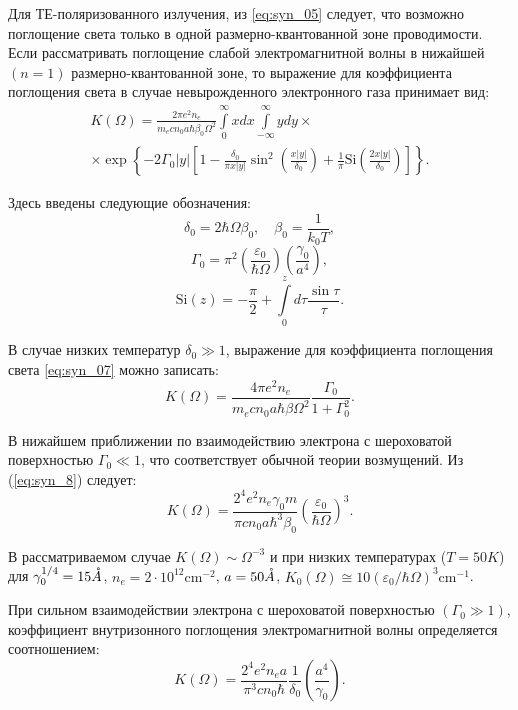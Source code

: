 Для ТЕ-поляризованного излучения, из \eqref{eq:syn_05} следует, что  возможно поглощение света только в одной размерно-квантованной зоне проводимости. Если рассматривать поглощение слабой электромагнитной волны в нижайшей $(n=1)$ размерно-квантованной зоне, то выражение для коэффициента поглощения света в случае невырожденного электронного газа принимает вид:
\begin{multline} \label{eq:syn_07}
K(\Omega) = \frac{2 \pi e^2 n_e }{m_e c n_0 a \hbar \beta_0 \Omega^2} \int\limits_0^{\infty}x dx \int\limits_{-\infty}^{\infty}y dy \times \\
\times \exp{\left\lbrace  - 2\Gamma_0 |y| \left[ 1 - \frac{\delta_0}{\pi x |y|}\sin^2{\left( \frac{x|y|}{\delta_0}\right) } + \frac{1}{\pi} \mathrm{Si}{\left( \frac{2x|y|}{\delta_0}\right) } \right]  \right\rbrace   }.
\end{multline} 

Здесь введены следующие обозначения:
\[
\delta_0 = 2\hbar \Omega \beta_0, \quad \beta_0 = \frac{1}{k_0 T},
\]
\[
\Gamma_0 = \pi^2 \left(\frac{\varepsilon_0}{\hbar \Omega} \right) \left( \frac{\gamma_0}{a^4} \right),
\]
\[
\mathrm{Si}(z) = -\frac{\pi}{2} + \int\limits_0^z{d\tau\frac{\sin{\tau}}{\tau}}.
\]

В случае низких температур $\delta_0 \gg 1$, выражение для коэффициента поглощения света \eqref{eq:syn_07} можно записать:
\begin{equation} \label{eq:syn_8}
K(\Omega )=\frac{4\pi e^{2} n_{e} }{m_e c n_0 a \hbar\beta \Omega^2 } \frac{\Gamma_0 }{1+\Gamma_0^2 }.
\end{equation} 

В нижайшем приближении по взаимодействию электрона с шероховатой поверхностью $\Gamma_0 \ll 1$, что соответствует обычной теории возмущений. Из (\ref{eq:syn_8}) следует:
\begin{equation} \label{eq:syn_9}
K(\Omega )=\frac{2^4 e^2 n_e \gamma_0 m}{\pi c n_0 a\hbar^3 \beta_0 } \left(\frac{\varepsilon_0 }{\hbar\Omega } \right)^3.
\end{equation} 

В рассматриваемом случае $K(\Omega )\sim \Omega^{-3} $ и при низких температурах ($T=50 K$) для $\gamma_0^{1/4} =15 \AA$, $n_e = 2\cdot 10^{12} \text{cm}^{-2} $, $a=50 \AA$, $K_0 (\Omega )\cong 10\left(\varepsilon_0 / \hbar\Omega \right)^3 \text{cm}^{-1} $.

При сильном взаимодействии электрона с шероховатой поверхностью $\left( \Gamma_0 \gg 1 \right) $, коэффициент внутризонного поглощения электромагнитной волны определяется соотношением:
\begin{equation} \label{eq:syn_10}
K(\Omega )=\frac{2^4 e^2 n_e a}{\pi^3 cn_0 \hbar } \frac{1}{\delta_0 } \left(\frac{a^4 }{\gamma_0 } \right).
\end{equation} 

